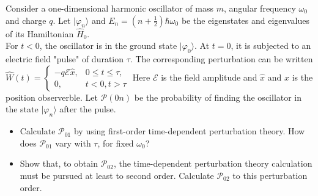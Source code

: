 \documentclass[10pt,a4paper]{article}
\newenvironment{problem}[2][Problem]{\begin{trivlist}
\item[\hskip \labelsep {\bfseries #1}\hskip \labelsep {\bfseries #2.}]}{\end{trivlist}}
\begin{document}
\begin{problem}{1}
[C-T Exercise 13-1] Consider a one-dimensional harmonic oscillator of mass $m$, angular frequency $\omega_0$ and charge $q$. Let $|\varphi_n\rangle$ and $E_n=(n+\frac{1}{2})\hbar\omega_0$ be the eigenstates and eigenvalues of its Hamiltonian $\hat{H}_0$.\\
For $t<0$, the oscillator is in the ground state $|\varphi_0\rangle$. At $t=0$, it is subjected to an electric field "pulse" of duration $\tau$. The corresponding perturbation can be written $\hat{W}(t)=\left\{\begin{array}{ll}-q\mathscr{E}\hat{x},&0\leq t\leq\tau,\\0,&t<0,t>\tau\end{array}\right.$ Here $\mathscr{E}$ is the field amplitude and $\hat{x}$ and $\hat{x}$ is the position observerble. Let $\mathscr{P}(0n)$ be the probability of finding the oscillator in the state $|\varphi_n\rangle$ after the pulse.
\begin{itemize}
\item[(a)] Calculate $\mathscr{P}_{01}$ by using first-order time-dependent perturbation theory. How does $\mathscr{P}_{01}$ vary with $\tau$, for fixed $\omega_0$?
\item[(b)] Show that, to obtain $\mathscr{P}_{02}$, the time-dependent perturbation theory calculation must be pursued at least to second order. Calculate $\mathscr{P}_{02}$ to this perturbation order.
\end{itemize}
\end{problem}
\end{document}
